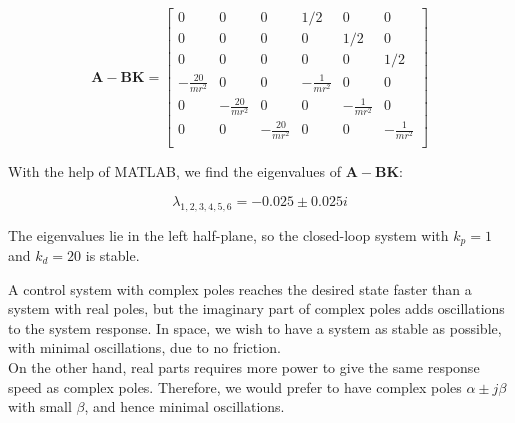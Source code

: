 \begin{equation*}
    \mathbf{A-BK} =
    \begin{bmatrix}
        0           &       0           &   0           &       1/2     &       0       &        0       \\
        0           &       0           &   0           &       0       &       1/2     &        0       \\
        0           &       0           &   0           &       0       &       0       &       1/2     \\
        -\frac{20}{mr^2}&   0           &   0           &   -\frac{1}{mr^2}&    0       &        0       \\
        0           &   -\frac{20}{mr^2}&   0           &       0       &   -\frac{1}{mr^2}&     0       \\
        0           &       0           &   -\frac{20}{mr^2}&   0       &       0       &   -\frac{1}{mr^2} \\
    \end{bmatrix}
\end{equation*}

With the help of MATLAB, we find the eigenvalues of $\mathbf{A-BK}$:

\begin{equation*}
    \lambda_{1,2,3,4,5,6} = -0.025 \pm 0.025i
\end{equation*}

The eigenvalues lie in the left half-plane, so the closed-loop system with $k_p = 1$ and $k_d = 20$ is stable.

A control system with complex poles reaches the desired state faster than a system with real poles, but the imaginary part of complex poles adds oscillations to the system response. In space, we wish to have a system as stable as possible, with minimal oscillations, due to no friction. \\
On the other hand, real parts requires more power to give the same response speed as complex poles. Therefore, we would prefer to have complex poles $\alpha \pm j\beta$ with small $\beta$, and hence minimal oscillations. 